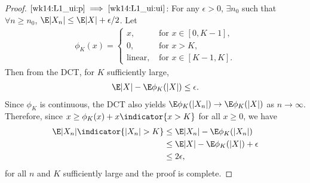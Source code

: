 \documentclass[../aipt.tex]{subfiles}
\begin{document}
\begin{proof}
$\ref{wk14:L1_ui:p} \implies \ref{wk14:L1_ui:ui}$: For any $\epsilon>0$, $\exists n_0$ such that $\forall n\geq n_0$, $\E|X_n| \leq \E|X|+\epsilon/2$. Let 
\begin{align*}
\phi_K(x) = \left\{
	\begin{array}{ll}
		x, & \text{ for $x\in[0,K-1]$}, \\
		0, & \text{ for $x> K$}, \\
		\text{linear}, & \text{ for $x\in[K-1,K]$}. 
	\end{array}
\right.
\end{align*}
Then from the DCT, for $K$ sufficiently large,
\begin{align*}
\E|X| - \E\phi_K(|X|) \leq \epsilon.
\end{align*}
Since $\phi_K$ is continuous, the DCT also yields $\E\phi_K(|X_n|) \to \E\phi_K(|X|)$ as $n\to\infty$. Therefore, since $x \geq \phi_K(x) + x\indicator{x>K}$ for all $x\geq0$, we have
\begin{align*}
\E|X_n|\indicator{|X_n|>K} 
&\leq \E|X_n| - \E\phi_K(|X_n|)\\
&\leq \E|X| - \E\phi_K(|X|) + \epsilon\\
&\leq 2\epsilon,
\end{align*}
for all $n$ and $K$ sufficiently large and the proof is complete.
\end{proof}


%

\end{document}
